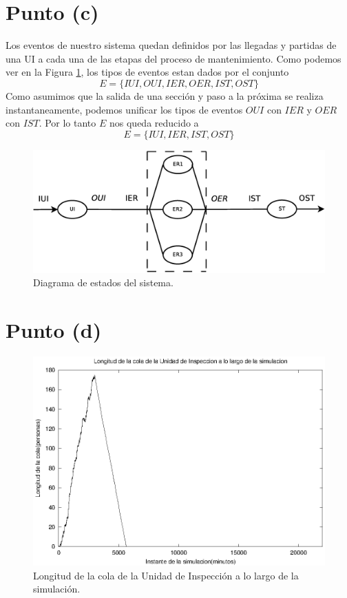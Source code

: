 \documentclass[a4paper,10pt]{article}
\begin{document}
\section{Punto (c)}
Los eventos de nuestro sistema quedan definidos por las llegadas y partidas de una UI a cada una de las etapas del proceso de mantenimiento. Como podemos ver en la Figura \ref{fig:events_diagram}, los tipos de eventos estan dados por el conjunto
\[
 E = \{IUI, OUI, IER, OER, IST, OST\}
\]
Como asumimos que la salida de una sección y paso a la próxima se realiza instantaneamente, podemos unificar los tipos de eventos $OUI$ con $IER$ y $OER$ con $IST$. Por lo tanto $E$ nos queda reducido a
\[
 E = \{IUI, IER, IST, OST\}
\]

\begin{figure}[ht]
\begin{center}
\includegraphics[width=12cm]{./states.eps}
\caption{\label{fig:events_diagram} Diagrama de estados del sistema.}
\end{center}
\end{figure}



\section{Punto (d)}

\begin{figure}[ht]
\begin{center}
\includegraphics[width=15cm]{./img/cola_UI.eps}
\caption{\label{fig:cola_UI} Longitud de la cola de la Unidad de Inspecci\'on a lo largo de la simulaci\'on.}
\end{center}
\end{figure}
\end{document}
